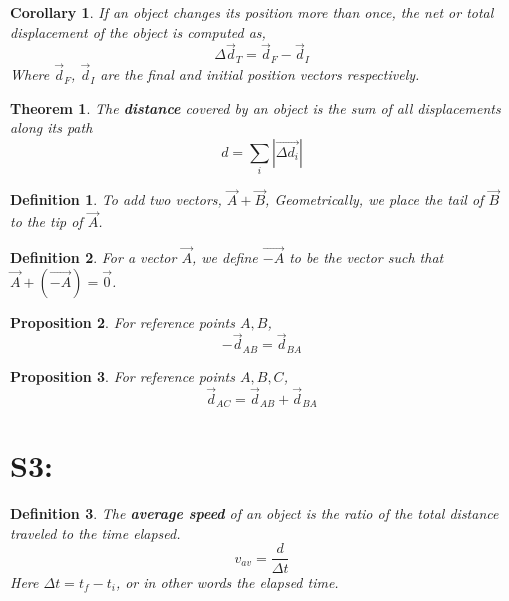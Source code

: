 \documentclass[12pt]{article}
\theoremstyle{break}
\newtheorem*{thm}{Theorem}[subsection]
\newtheorem*{cor}{Corollary}[thm]
\newtheorem*{defn}{Definition}[subsection]
\newtheorem*{prop}[thm]{Proposition}
\begin{document}
\begin{cor}
    If an object changes its position more than once, the \emph{net} or \emph{total}  displacement of the
    object is computed as, $$\Delta \vec d_T = \vec d_F - \vec d_I$$
    Where $\vec d_F$, $\vec d_I$ are the final and initial position vectors respectively.
\end{cor}


\begin{thm}
	The \textbf{distance} covered by an object is the sum of all displacements along its path
	$$ d = \sum_i |\overrightarrow{\Delta d_i}|$$
\end{thm}

\begin{defn}
		To add two vectors, $\vec A + \vec B$, \emph{Geometrically}, we place the \emph{tail} of $\vec B$ to the
		\emph{tip} of $\vec A$.
\end{defn}	

\begin{defn}
    For a vector $\vec A$, we define $\overrightarrow {-A}$ to be the vector such that $\vec A +
    (\overrightarrow{-A}) = \vec 0$.
\end{defn}

\begin{prop}
	For reference points $A,B$,
$$-\vec d_{AB} = \vec d_{BA}$$
\end{prop}

\begin{prop}
	For reference points $A,B,C$, $$\vec d_{AC} = \vec d_{AB} + \vec d_{BA}$$ 
 \end{prop}





\section{S3:}

\begin{defn}
The \textbf{average speed} of an object is the ratio of the total distance traveled to the time elapsed. 
$$v_{av} = \frac{d}{\Delta t}$$
Here $\Delta t = t_f - t_i$, or in other words the elapsed time.
\end{defn}
\end{document}
